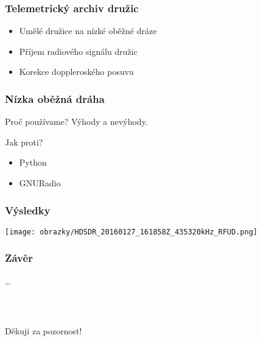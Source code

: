 \documentclass[%
  12pt,               %
  t,                  %
  aspectratio=1610,   %
  unicode,            %
czech,              %
]{beamer}              %
\begin{document}
\vypninavigacnisymboly

\vytvortitulku

\begin{frame} 
  \frametitle{Telemetrický archiv družic}
  \begin{itemize}
    \item Umělé družice na nízké oběžné dráze
    \item Příjem radiového signálu družic
    \item Korekce doppleroského posuvu
  \end{itemize}
\end{frame}

\begin{frame} 
  \frametitle{Nízka oběžná dráha}



  \begin{block}{Proč používame?}
    Výhody a nevýhody.
  \end{block}

  \begin{alertblock}{Jak proti?}
    \begin{itemize}
      \item Python
      \item GNURadio
    \end{itemize}
  \end{alertblock}
\end{frame} 


\begin{frame} 
  \frametitle{}
  
\end{frame}


\begin{frame} 
  \frametitle{Výsledky}
      \texttt{[image: obrazky/HDSDR\_20160127\_161858Z\_435320kHz\_RFUD.png]}

\end{frame}


\begin{frame} 
  \frametitle{Závěr}
  \dots
\end{frame}


\begin{frame}[c] 
  \frametitle{\mbox{ }}
  \begin{center}
    {\Huge Děkuji za pozornost!}
  \end{center}
\end{frame}
\end{document}
